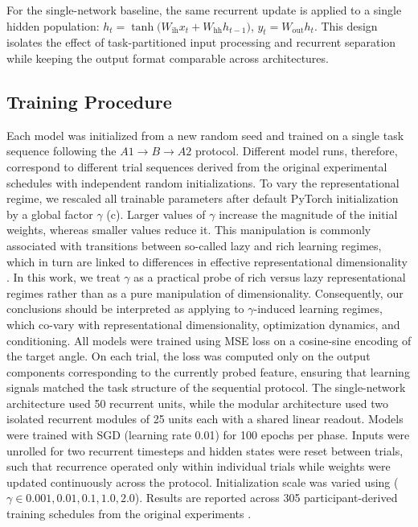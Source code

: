 \documentclass{article}
\theoremstyle{plain}
\theoremstyle{definition}
\theoremstyle{remark}
\begin{document}
        For the single-network baseline, the same recurrent update is applied to a single hidden population:        $h_t = \tanh\!\big(W_{\mathrm{ih}} x_t + W_{\mathrm{hh}} h_{t-1}\big)$, $y_t = W_{\mathrm{out}} h_t$. This design isolates the effect of task-partitioned input processing and recurrent separation while keeping the output format comparable across architectures.
        
        \subsection{Training Procedure}
        
        Each model was initialized from a new random seed and trained on a single task sequence following the $A1 \rightarrow B \rightarrow A2$ protocol. Different model runs, therefore, correspond to different trial sequences derived from the original experimental schedules with independent random initializations. To vary the representational regime, we rescaled all trainable parameters after default PyTorch initialization by a global factor $\gamma$ (c). Larger values of $\gamma$ increase the magnitude of the initial weights, whereas smaller values reduce it. This manipulation is commonly associated with transitions between so-called lazy and rich learning regimes, which in turn are linked to differences in effective representational dimensionality \cite{flesch2021rich}. %
        In this work, we treat $\gamma$ as a practical probe of rich versus lazy representational regimes rather than as a pure manipulation of dimensionality. Consequently, our conclusions should be interpreted as applying to $\gamma$-induced learning regimes, which co-vary with representational dimensionality, optimization dynamics, and conditioning.
        All models were trained using MSE loss on a cosine-sine encoding of the target angle. On each trial, the loss was computed only on the output components corresponding to the currently probed feature, ensuring that learning signals matched the task structure of the sequential protocol. %
        The single-network architecture used 50 recurrent units, while the modular architecture used two isolated recurrent modules of 25 units each with a shared linear readout. Models were trained with SGD (learning rate 0.01) for 100 epochs per phase. Inputs were unrolled for two recurrent timesteps and hidden states were reset between trials, such that recurrence operated only within individual trials while weights were updated continuously across the protocol. Initialization scale was varied using ($\gamma \in {0.001, 0.01, 0.1, 1.0, 2.0}$). Results are reported across 305 participant-derived training schedules from the original experiments \cite{holton2025humans}.
        
\end{document}
